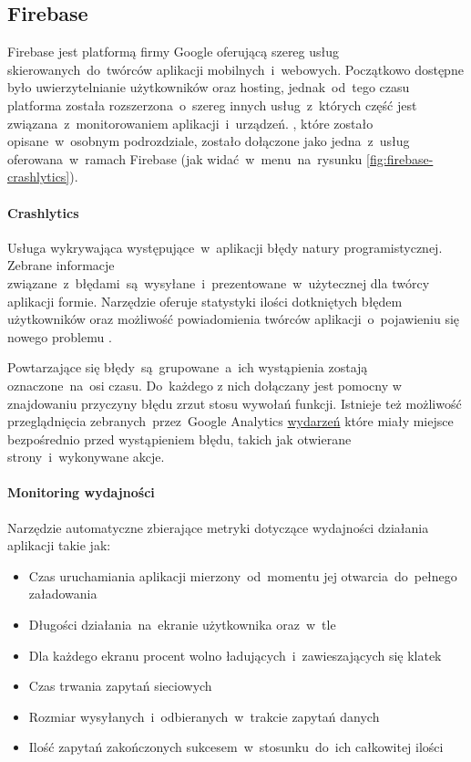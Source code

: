 \subsection{Firebase}
\label{sec:firebase}
Firebase jest platformą firmy Google oferującą szereg usług skierowanych~do~twórców aplikacji mobilnych~i~webowych. Początkowo dostępne było uwierzytelnianie użytkowników oraz hosting, jednak~od~tego czasu platforma została rozszerzona~o~szereg innych usług~z~których część jest związana~z~monitorowaniem aplikacji~i~urządzeń. , które zostało opisane~w~osobnym podrozdziale, zostało dołączone jako jedna~z~usług oferowana~w~ramach Firebase (jak widać~w~menu~na~rysunku \ref{fig:firebase-crashlytics}).

\bigskip
{}

\paragraph{Crashlytics}
Usługa wykrywająca występujące~w~aplikacji błędy natury programistycznej. Zebrane informacje związane~z~błędami~są~wysyłane~i~prezentowane~w~użytecznej dla twórcy aplikacji formie. Narzędzie oferuje statystyki ilości dotkniętych błędem użytkowników oraz możliwość powiadomienia twórców aplikacji~o~pojawieniu się nowego problemu \cite{Fb_Crashlytics}.

Powtarzające się błędy~są~grupowane~a~ich wystąpienia zostają oznaczone~na~osi czasu. Do~każdego z nich dołączany jest pomocny w znajdowaniu przyczyny błędu zrzut stosu wywołań funkcji. Istnieje też możliwość przeglądnięcia zebranych~przez~Google Analytics \hyperref[par:ga-events]{wydarzeń} które miały miejsce bezpośrednio przed wystąpieniem błędu, takich jak otwierane strony~i~wykonywane akcje. 

\paragraph{Monitoring wydajności}
Narzędzie automatyczne zbierające metryki dotyczące wydajności działania aplikacji takie jak:
\begin{itemize}
	\item Czas uruchamiania aplikacji mierzony~od~momentu jej otwarcia~do~pełnego załadowania
	\item Długości działania~na~ekranie użytkownika oraz~w~tle
	\item Dla każdego ekranu procent wolno ładujących~i~zawieszających się klatek
	\item Czas trwania zapytań sieciowych
	\item Rozmiar wysyłanych~i~odbieranych~w~trakcie zapytań danych
	\item Ilość zapytań zakończonych sukcesem~w~stosunku~do~ich całkowitej ilości
\end{itemize}
\bigskip


